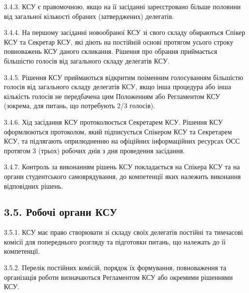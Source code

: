     3.4.3. КСУ є правомочною, якщо на її засіданні зареєстровано більше половини від загальної кількості обраних (затверджених) делегатів.

    3.4.4. На першому засіданні новообраної КСУ зі свого складу обираються Спікер КСУ та Секретар КСУ, які діють на постійній основі протягом усього строку повноважень КСУ даного скликання. Рішення про обрання приймається більшістю голосів від загального складу делегатів КСУ.

    3.4.5. Рішення КСУ приймаються відкритим поіменним голосуванням більшістю голосів від загального складу делегатів КСУ, якщо інша процедура або інша кількість голосів не передбачена цим Положенням або Регламентом КСУ (зокрема, для питань, що потребують 2/3 голосів).

    3.4.6. Хід засідання КСУ протоколюється Секретарем КСУ. Рішення КСУ оформлюються протоколом, який підписується Спікером КСУ та Секретарем КСУ, та підлягають оприлюдненню на офіційних інформаційних ресурсах ОСС протягом 3 (трьох) робочих днів з дня проведення засідання.

    3.4.7. Контроль за виконанням рішень КСУ покладається на Спікера КСУ та на органи студентського самоврядування, до компетенції яких належить виконання відповідних рішень.

\subsection*{3.5. Робочі органи КСУ}
    3.5.1. КСУ має право створювати зі складу своїх делегатів постійні та тимчасові комісії для попереднього розгляду та підготовки питань, що належать до її компетенції.

    3.5.2. Перелік постійних комісій, порядок їх формування, повноваження та організація роботи визначаються Регламентом КСУ або окремими рішеннями КСУ.